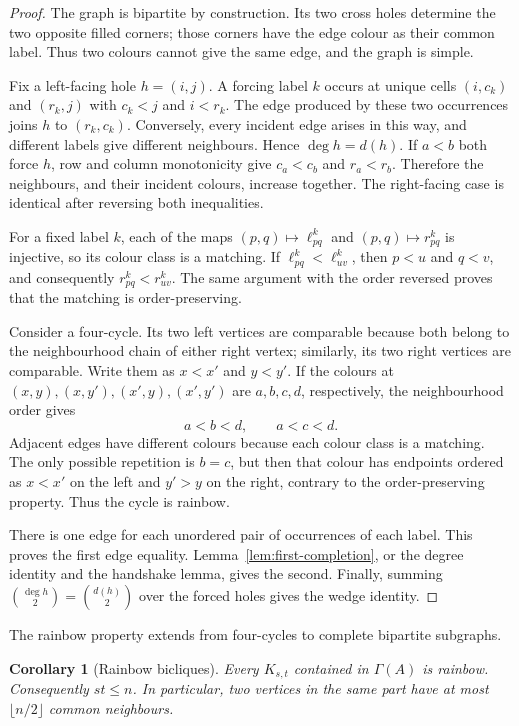 \documentclass[11pt]{article}
\numberwithin{equation}{section}
\newtheorem{corollary}[theorem]{Corollary}
\theoremstyle{definition}
\theoremstyle{remark}
\begin{document}
\begin{proof}
The graph is bipartite by construction.  Its two cross holes determine the
two opposite filled corners; those corners have the edge colour as their
common label.  Thus two colours cannot give the same edge, and the graph is
simple.

Fix a left-facing hole $h=(i,j)$.  A forcing label $k$ occurs at unique cells
$(i,c_k)$ and $(r_k,j)$ with $c_k<j$ and $i<r_k$.  The edge produced by these
two occurrences joins $h$ to $(r_k,c_k)$.  Conversely, every incident edge
arises in this way, and different labels give different neighbours.  Hence
$\deg h=d(h)$.  If $a<b$ both force $h$, row and column monotonicity give
$c_a<c_b$ and $r_a<r_b$.  Therefore the neighbours, and their incident
colours, increase together.  The right-facing case is identical after
reversing both inequalities.

For a fixed label $k$, each of the maps $(p,q)\mapsto\ell^k_{pq}$ and
$(p,q)\mapsto r^k_{pq}$ is injective, so its colour class is a matching.  If
$\ell^k_{pq}<\ell^k_{uv}$, then $p<u$ and $q<v$, and consequently
$r^k_{pq}<r^k_{uv}$.  The same argument with the order reversed proves that
the matching is order-preserving.

Consider a four-cycle.  Its two left vertices are comparable because both
belong to the neighbourhood chain of either right vertex; similarly, its two
right vertices are comparable.  Write them as $x<x'$ and $y<y'$.  If the
colours at $(x,y),(x,y'),(x',y),(x',y')$ are $a,b,c,d$, respectively, the
neighbourhood order gives
\[
 a<b<d,\qquad a<c<d.
\]
Adjacent edges have different colours because each colour class is a
matching.  The only possible repetition is $b=c$, but then that colour has
endpoints ordered as $x<x'$ on the left and $y'>y$ on the right, contrary to
the order-preserving property.  Thus the cycle is rainbow.

There is one edge for each unordered pair of occurrences of each label.  This
proves the first edge equality.  Lemma~\ref{lem:first-completion}, or the
degree identity and the handshake lemma, gives the second.  Finally, summing
$\binom{\deg h}{2}=\binom{d(h)}2$ over the forced holes gives the wedge
identity.
\end{proof}

The rainbow property extends from four-cycles to complete bipartite subgraphs.

\begin{corollary}[Rainbow bicliques]\label{cor:rainbow-bicliques}
Every $K_{s,t}$ contained in $\Gamma(A)$ is rainbow.  Consequently $st\le n$.
In particular, two vertices in the same part have at most $\lfloor n/2\rfloor$
common neighbours.
\end{corollary}
\end{document}
